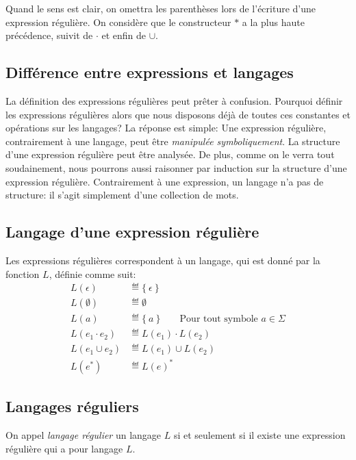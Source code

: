 Quand le sens est clair, on omettra les parenthèses lors de l'écriture d'une expression régulière.
On considère que le constructeur $*$ a la plus haute précédence, suivit de $\cdot$ et enfin de $\cup$.

\subsection{Différence entre expressions et langages}

La définition des expressions régulières peut prêter à confusion.
Pourquoi définir les expressions régulières alors que nous disposons déjà de toutes ces constantes et opérations sur les langages?
La réponse est simple: Une expression régulière, contrairement à une langage, peut être \textit{manipulée symboliquement}.
La structure d'une expression régulière peut être analysée.
De plus, comme on le verra tout soudainement, nous pourrons aussi raisonner par induction sur la structure d'une expression régulière.
Contrairement à une expression, un langage n'a pas de structure: il s'agit simplement d'une collection de mots.

\subsection{Langage d'une expression régulière}

Les expressions régulières correspondent à un langage, qui est donné par la fonction $L$, définie comme suit:
\begin{align*}
L(\epsilon) &\eqdef \{\ \epsilon\ \}\\
L(\emptyset) &\eqdef \emptyset\\
L(a) &\eqdef \{\ a\ \} \hspace{2em}\text{Pour tout symbole $a \in \Sigma$}\\
L(e_1 \cdot e_2) &\eqdef L(e_1) \cdot L(e_2)\\
L(e_1 \cup e_2) &\eqdef L(e_1) \cup L(e_2)\\
L(e^*) &\eqdef L(e)^*
\end{align*}

\subsection{Langages réguliers}

On appel \og \textit{langage régulier} \fg{} un langage $L$ si et seulement si il existe une expression régulière qui a pour langage $L$.

